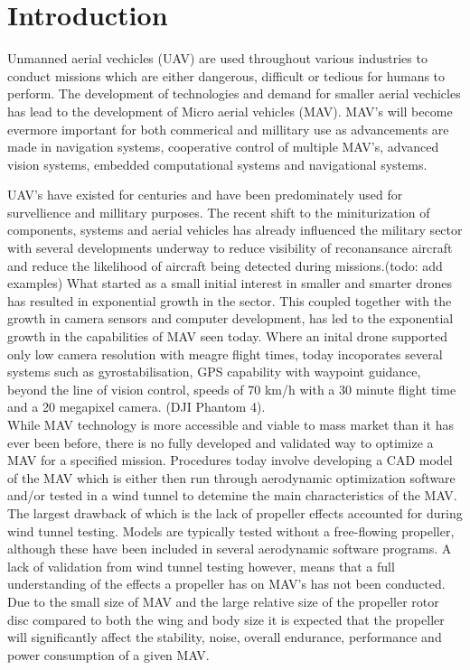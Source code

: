 \graphicspath{{./Figs/}}

\chapter{Introduction} 


Unmanned aerial vechicles (UAV) are used throughout various industries to conduct missions which are either dangerous, difficult or tedious for humans to perform. The development of technologies and demand for smaller aerial vechicles has lead to the development of Micro aerial vehicles (MAV). MAV's will become evermore important for both commerical and millitary use as advancements are made in navigation systems, cooperative control of multiple MAV's, advanced vision systems, embedded computational systems and navigational systems. 

\label{subsec:Proliferation of MAV's in the Aerospace Landscape}

UAV's have existed for centuries and have been predominately used for survellience and millitary purposes. The recent shift to the miniturization of components, systems and aerial vehicles has already influenced the military sector with several developments underway to reduce visibility of reconansance aircraft and reduce the likelihood of aircraft being detected during missions.(todo: add examples) What started as a small initial interest in smaller and smarter drones has resulted in exponential growth in the sector. This coupled together with the growth in camera sensors and computer development, has led to the exponential growth in the capabilities of MAV seen today. Where an inital drone supported only low camera resolution with meagre flight times, today incoporates several systems such as gyrostabilisation, GPS capability with waypoint guidance, beyond the line of vision control, speeds of 70 km/h with a 30 minute flight time and a 20 megapixel camera. (DJI Phantom 4). \\

\label{subsec: Limitations of Current Developed MAV}
While MAV technology is more accessible and viable to mass market than it has ever been before, there is no fully developed and validated way to optimize a MAV for a specified mission. Procedures today involve developing a CAD model of the MAV which is either then run through aerodynamic optimization software and/or tested in a wind tunnel to detemine the main characteristics of the MAV. The largest drawback of which is the lack of propeller effects accounted for during wind tunnel testing. Models are typically tested without a free-flowing propeller, although these have been included in several aerodynamic software programs. A lack of validation from wind tunnel testing however, means that a full understanding of the effects a propeller has on MAV's has not been conducted. Due to the small size of MAV and the large relative size of the propeller rotor disc compared to both the wing and body size it is expected that the propeller will significantly affect the stability, noise, overall endurance, performance and power consumption of a given MAV. 


